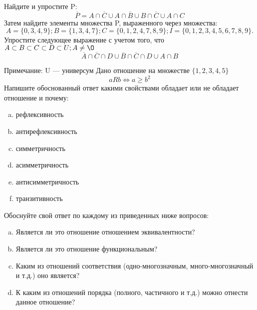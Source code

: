\documentclass[10pt]{exam}
\begin{document}
\begin{questions}
\question
Найдите и упростите P:
\begin{equation*}
\overline{P} = A \cap \overline{C} \cup A \cap \overline{B} \cup B \cap \overline{C} \cup A \cap C
\end{equation*}
Затем найдите элементы множества P, выраженного через множества:
\begin{equation*}
A = \{0, 3, 4, 9\}; 
B = \{1, 3, 4, 7\};
C = \{0, 1, 2, 4, 7, 8, 9\};
I = \{0, 1, 2, 3, 4, 5, 6, 7, 8, 9\}.
\end{equation*}\question
Упростите следующее выражение с учетом того, что $A\subset B \subset C \subset D \subset U; A \neq \O$
\begin{equation*}
\overline{A} \cap \overline{C} \cap D \cup \overline{B} \cap \overline{C} \cap D \cup A \cap B
\end{equation*}

Примечание: U — универсум\question
Дано отношение на множестве $\{1, 2, 3, 4, 5\}$ 
\begin{equation*}
aRb \iff a \geq b^2
\end{equation*}
Напишите обоснованный ответ какими свойствами обладает или не обладает отношение и почему:   
\begin{enumerate} [a)]\setcounter{enumi}{0}
\item рефлексивность
\item антирефлексивность
\item симметричность
\item асимметричность
\item антисимметричность
\item транзитивность
\end{enumerate}

Обоснуйте свой ответ по каждому из приведенных ниже вопросов:
\begin{enumerate} [a)]\setcounter{enumi}{0}
    \item Является ли это отношение отношением эквивалентности?
    \item Является ли это отношение функциональным?
    \item Каким из отношений соответствия (одно-многозначным, много-многозначный и т.д.) оно является?
    \item К каким из отношений порядка (полного, частичного и т.д.) можно отнести данное отношение?
\end{enumerate}



\end{questions}
\end{document}
